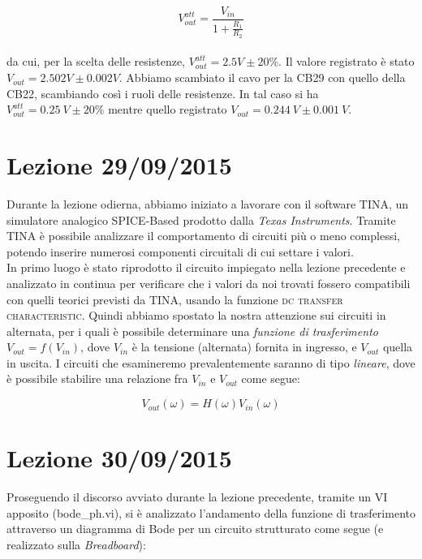 \documentclass[journal, a4paper]{IEEEtran}
\begin{document}
\begin{equation}
V_{out}^{att}= \frac{V_{in}}{1+\frac{R_1}{R_2}}
\end{equation}\\

da cui, per la scelta delle resistenze, $V_{out}^{att} = 2.5 V \pm 20 \%$. Il valore registrato è stato $V_{out} = 2.502 V \pm 0.002 V$. Abbiamo scambiato il cavo per la CB29 con quello della CB22, scambiando così i ruoli delle resistenze. In tal caso si ha $V_{out}^{att} = 0.25~ V \pm 20 \%$ mentre quello registrato $V_{out} = 0.244 ~V \pm 0.001 ~V$.

\section{Lezione 29/09/2015}
Durante la lezione odierna, abbiamo iniziato a lavorare con il software TINA, un simulatore analogico SPICE-Based prodotto dalla \textit{Texas Instruments}. Tramite TINA è possibile analizzare il comportamento di circuiti più o meno complessi, potendo inserire numerosi componenti circuitali di cui settare i valori. \\
In primo luogo è stato riprodotto il circuito impiegato nella lezione precedente e analizzato in continua per verificare che i valori da noi trovati fossero compatibili con quelli teorici previsti da TINA, usando la funzione \textsc{dc transfer characteristic}.
Quindi abbiamo spostato la nostra attenzione sui circuiti in alternata, per i quali è possibile determinare una \textit{funzione di trasferimento} $V_{out} = f(V_{in})$, dove $V_{in}$ è la tensione (alternata) fornita in ingresso, e $V_{out}$ quella in uscita.
I circuiti che esamineremo prevalentemente saranno di tipo \textit{lineare}, dove è possibile stabilire una relazione fra $V_{in}$ e $V_{out}$ come segue:

\begin{equation}
V_{out}(\omega)= H(\omega)V_{in}(\omega)
\end{equation}


\section{Lezione 30/09/2015}
Proseguendo il discorso avviato durante la lezione precedente, tramite un VI apposito (bode\_ph.vi), si è analizzato l'andamento della funzione di trasferimento attraverso un diagramma di Bode per un circuito strutturato come segue (e realizzato sulla \textit{Breadboard}):\\
\end{document}
